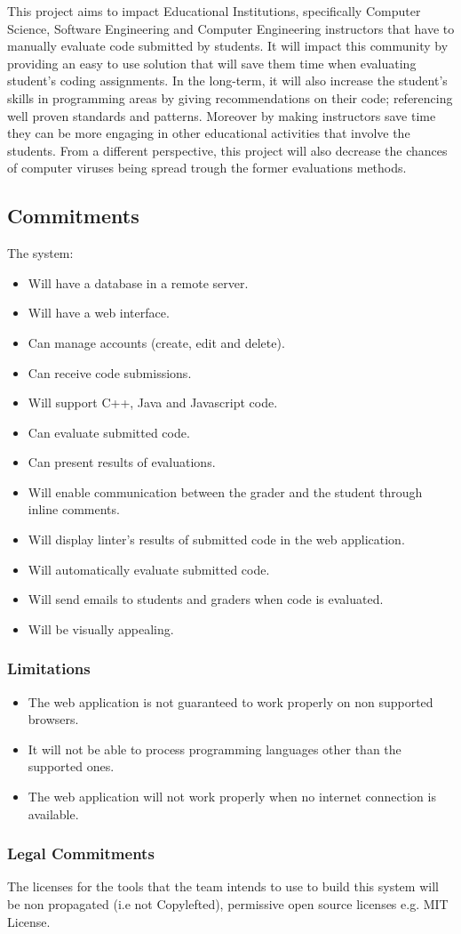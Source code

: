 
This project aims to impact Educational Institutions, specifically Computer
Science, Software Engineering and Computer Engineering instructors that have to
manually evaluate code submitted by students. It will impact this community by
providing an easy to use solution that will save them time when evaluating
student's coding assignments. In the long-term, it will also increase the
student's skills in programming areas by giving recommendations on their code;
referencing well proven standards and patterns. Moreover by making instructors
save time they can be more engaging in other educational activities that involve 
the students. From a different perspective, this project will also decrease the
chances of computer viruses being spread trough the former evaluations methods.

\subsection{Commitments}
The system:
\begin{itemize}
\item Will have a database in a remote server.
\item Will have a web interface.
\item Can manage accounts (create, edit and delete).
\item Can receive code submissions.
\item Will support C++, Java and Javascript code.
\item Can evaluate submitted code.
\item Can present results of evaluations.
\item Will enable communication between the grader and the student through
inline comments.
\item Will display linter's results of submitted code in the web application.
\item Will automatically evaluate submitted code.
\item Will send emails to students and graders when code is evaluated.
\item Will be visually appealing.
\end{itemize}

\subsubsection{Limitations}
\begin{itemize}
\item The web application is not guaranteed to work properly on non supported
browsers.
\item It will not be able to process programming languages other than the
supported ones.
\item The web application will not work properly when no internet connection is
available.
\end{itemize}

\subsubsection{Legal Commitments}

The licenses for the tools that the team intends to use to build this system
will be non propagated (i.e not Copylefted), permissive open source licenses
e.g. MIT License.
